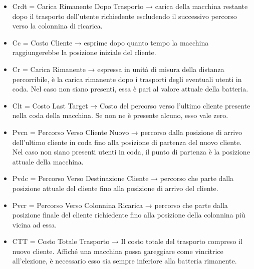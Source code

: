 \begin{itemize}
	\item Crdt = Carica Rimanente Dopo Trasporto → carica della macchina restante dopo il trasporto dell'utente richiedente escludendo il successivo percorso verso la colonnina di ricarica.
	
	\item Cc = Costo Cliente → esprime dopo quanto tempo la macchina raggiungerebbe la posizione iniziale del cliente.
	
	\item Cr = Carica Rimanente → espressa in unità di misura della distanza percorribile, è la carica rimanente dopo i trasporti degli eventuali utenti in coda. Nel caso non siano presenti, essa è pari al valore attuale della batteria.
	
	\item Clt = Costo Last Target → Costo del percorso verso l'ultimo cliente presente nella coda della macchina. Se non ne è presente alcuno, esso vale zero.
	
	\item Pvcn = Percorso Verso Cliente Nuovo → percorso dalla posizione di arrivo dell'ultimo cliente in coda fino alla posizione di partenza del nuovo cliente. Nel caso non siano presenti utenti in coda, il punto di partenza è la posizione attuale della macchina.
	
	\item Pvdc = Percorso Verso Destinazione Cliente → percorso che parte dalla posizione attuale del cliente fino alla posizione di arrivo del cliente. 
	
	\item Pvcr = Percorso Verso Colonnina Ricarica → percorso che parte dalla posizione finale del cliente richiedente fino alla posizione della colonnina più vicina ad essa. 
	
	\item CTT = Costo Totale Trasporto → Il costo totale del trasporto compreso il nuovo cliente. Affiché una macchina possa gareggiare come vincitrice all'elezione, è necessario esso sia sempre inferiore alla batteria rimanente.
\end{itemize}

